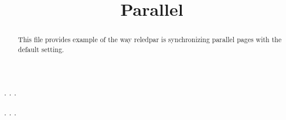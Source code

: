 \documentclass[a5paper,12pt]{article}
\begin{document}
\large

\date{}
\title{Parallel}
\maketitle

\begin{abstract}
This file provides example of the way reledpar is synchronizing parallel pages with the default setting.
\end{abstract}


\begin{pages}
    \begin{Leftside}
        \beginnumbering
            . \blindtext[21]
            \pend{}. \blindtext[10]
            \pend{}. \blindtext[6]
            \pend
        \endnumbering
    \end{Leftside}
    \begin{Rightside}
        \beginnumbering
            . \blindtext[22]\footnoteAmk
            \pend{}. \blindtext[12]
            \pend{}. \blindtext[12]
            \pend
        \endnumbering
    \end{Rightside}
\end{pages}
\Pages
\end{document}
